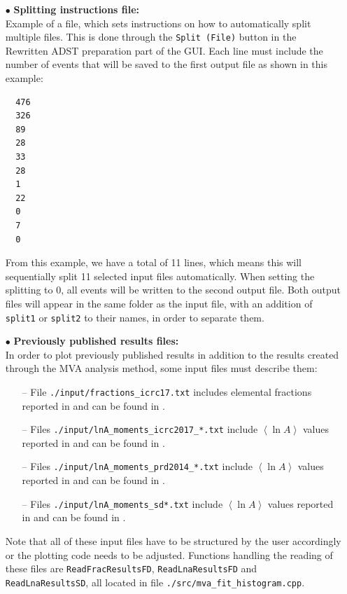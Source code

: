 \documentclass[12pt,a4paper]{report}
\begin{document}
\begin{itemize}
\item[$\bullet$] \textbf{Splitting instructions file:}\\Example of a file, which sets instructions on how to automatically split multiple files. This is done through the \texttt{Split (File)} button in the Rewritten ADST preparation part of the GUI. Each line must include the number of events that will be saved to the first output file as shown in this example:
{\footnotesize
\begin{verbatim}
  476
  326
  89
  28
  33
  28
  1
  22
  0
  7
  0
\end{verbatim}
}
From this example, we have a total of 11 lines, which means this will sequentially split 11 selected input files automatically. When setting the splitting to 0, all events will be written to the second output file. Both output files will appear in the same folder as the input file, with an addition of \texttt{split1} or \texttt{split2} to their names, in order to separate them.
\item[$\bullet$] \textbf{Previously published results files:}\\In order to plot previously published results in addition to the results created through the MVA analysis method, some input files must describe them:
	\begin{itemize}
	\item[--] File \texttt{./input/fractions\_icrc17.txt} includes elemental fractions reported in \cite{xmaxICRC2017} and can be found in \cite{CompositionAugerWiki}.
	\item[--] Files \texttt{./input/lnA\_moments\_icrc2017\_*.txt} include $\left<\ln A\right>$ values reported in \cite{xmaxICRC2017} and can be found in \cite{CompositionAugerWiki}.
	\item[--] Files \texttt{./input/lnA\_moments\_prd2014\_*.txt} include $\left<\ln A\right>$ values reported in \cite{xmaxDistFitPRD2014} and can be found in \cite{UngerComposition}.
	\item[--] Files \texttt{./input/lnA\_moments\_sd*.txt} include $\left<\ln A\right>$ values reported in \cite{deltaMethod} and can be found in \cite{DeltaComposition}.
	\end{itemize}
Note that all of these input files have to be structured by the user accordingly or the plotting code needs to be adjusted. Functions handling the reading of these files are \texttt{ReadFracResultsFD}, \texttt{ReadLnaResultsFD} and \texttt{ReadLnaResultsSD}, all located in file \texttt{./src/mva\_fit\_histogram.cpp}.
\end{itemize}
\end{document}
